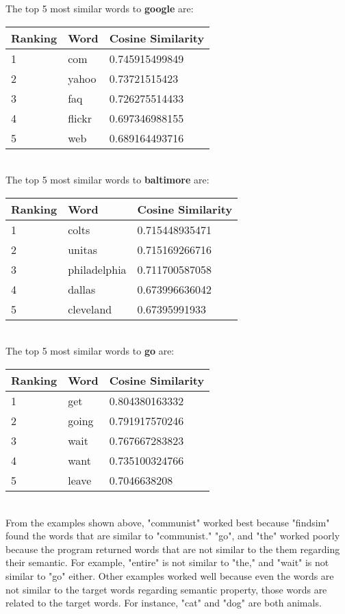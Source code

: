 \documentclass{article}
\begin{document}
\noindent
The top 5 most similar words to \textbf{google} are:\\
\begin{tabular}{ p{2.5cm}|p{2.5cm}|p{3cm}  }
 \hline
 Ranking & Word & Cosine Similarity\\
 \hline
1 & com & 0.745915499849\\
2 & yahoo & 0.73721515423\\
3 & faq & 0.726275514433\\
4 & flickr & 0.697346988155\\
5 & web & 0.689164493716\\
 \hline
\end{tabular}\\

\noindent
The top 5 most similar words to \textbf{baltimore} are:\\
\begin{tabular}{ p{2.5cm}|p{2.5cm}|p{3cm}  }
 \hline
 Ranking & Word & Cosine Similarity\\
 \hline
1 & colts & 0.715448935471\\
2 & unitas & 0.715169266716\\
3 & philadelphia & 0.711700587058\\
4 & dallas & 0.673996636042\\
5 & cleveland & 0.67395991933\\
 \hline
\end{tabular}\\

\noindent
The top 5 most similar words to \textbf{go} are:\\
\begin{tabular}{ p{2.5cm}|p{2.5cm}|p{3cm}  }
 \hline
 Ranking & Word & Cosine Similarity\\
 \hline
1 & get & 0.804380163332\\
2 & going & 0.791917570246\\
3 & wait & 0.767667283823\\
4 & want & 0.735100324766\\
5 & leave & 0.7046638208\\
 \hline
\end{tabular}\\

\noindent
From the examples shown above, "communist" worked best because "findsim" found the words that are similar to "communist." "go", and "the" worked poorly because the program returned words that are not similar to the them regarding their semantic. For example, "entire" is not similar to "the," and "wait" is not similar to "go" either. Other examples worked well because even the words are not similar to the target words regarding semantic property, those words are related to the target words. For instance, "cat" and "dog" are both animals.\\
\end{document}
